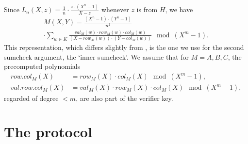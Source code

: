 \documentclass[10pt,article,oneside]{memoir}
\theoremstyle{definition}
\theoremstyle{remark}
\begin{document}
Since   $L_n(X, z)= \frac{1}{n}\cdot \frac{z \cdot (X^n-1)}{X - z}$ whenever $z$ is from $H$, we have
\begin{multline}
\label{e:MatrixRepresentationSumcheck}
M(X, Y)
=\frac{(X^n-1)\cdot (Y^n-1)}{n^2}
\\
\cdot\sum_{w \in K } 
\frac{val_M(w) \cdot row_M(w)\cdot col_M(w)}{\left(X - row_M(w)\right)\cdot\left( Y - col_M(w)\right)} \mod (X^m-1).
\end{multline}
This representation, which differs slightly from \cite{Marlin}, is the one we use for the second sumcheck argument, the `inner sumcheck'.
We assume that for $M=A,B,C$, the precomputed polynomials
\begin{align}
\label{e:rowcol}
row.col_M(X) &= row_M(X)\cdot col_M(X) \mod (X^m-1),
\\
\label{e:valrowcol}
val.row.col_M(X)&= val_M(X)\cdot row_M(X)\cdot col_M(X) \mod (X^m-1),
\end{align}
regarded of degree $<m$, are also part of the verifier key.




\section{The protocol}
\end{document}
